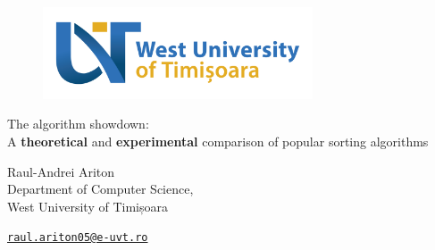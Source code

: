 \documentclass[a4paper]{article}
\begin{document}

    \begin{figure}[t]
        \centering
        \includegraphics[width=8cm]{../assets/UVT_logo_en.png}
    \end{figure}

    \begin{center}
        {\selectfont

            {\hypertarget{title}{\huge 
                The algorithm showdown: \\
                A \textbf{theoretical} and \textbf{experimental} comparison of popular sorting algorithms
                }
            }

            \vspace{0.5cm}

            {\Large Raul-Andrei Ariton \\ Department of Computer Science, \\ West University of Timișoara}
        }

        \vspace{0.25cm}

        {\large \href{mailto:raul.ariton05@e-uvt.ro}{\texttt{raul.ariton05@e-uvt.ro}}}
        
    \end{center}

    \vspace{0.25cm}

    \begin{abstract}
        
        Perhaps one of the most fundamental problems in Computer Science, algorithms that solve the problem of sorting are critical to anyone starting out in the area of Algorithms and Data Structures. They are a showcase of clever algorithmic thinking, as well as an application of common algorithm design techniques.

        This research paper compares popular sorting algorithms such as 
        Bubble Sort, Selection Sort, QuickSort,
        and more, using a theoretical as well as a practical, experimental approach.

        Generally, this paper aims to emphasize that there is no ``superior'' sorting algorithm and that each algorithm has its ideal use case, its strengths and weaknesses. Such weaknesses are showcased, and moreover potential optimizations are discussed, in order to ensure algorithm reliability and stability.

        The findings of this paper aim to guide developers, researchers in choosing the algorithm that suits their sorting problem the best.
        
    \end{abstract}
\end{document}
